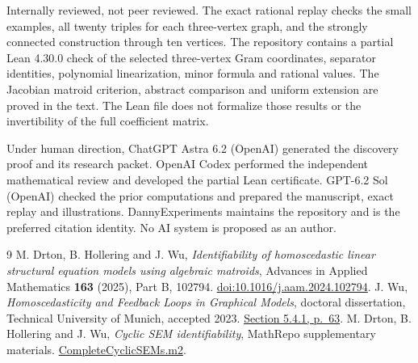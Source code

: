 \documentclass[11pt,a4paper]{amsart}
\begin{document}
Internally reviewed, not peer reviewed. The exact rational replay
checks the small examples, all twenty triples for each three-vertex
graph, and the strongly connected construction through ten vertices.
The repository contains a partial Lean 4.30.0 check of the selected
three-vertex Gram coordinates, separator identities, polynomial
linearization, minor formula and rational values. The Jacobian
matroid criterion, abstract comparison and uniform extension are
proved in the text. The Lean file does not formalize those results
or the invertibility of the full coefficient matrix.

Under human direction, ChatGPT Astra 6.2 (OpenAI) generated the
discovery proof and its research packet. OpenAI Codex performed the
independent mathematical review and developed the partial Lean
certificate. GPT-6.2 Sol (OpenAI) checked the prior computations
and prepared the manuscript, exact replay and illustrations.
DannyExperiments maintains the repository and is the preferred
citation identity. No AI system is proposed as an author.

\begin{thebibliography}{9}
M. Drton, B. Hollering and J. Wu,
\emph{Identifiability of homoscedastic linear structural equation
models using algebraic matroids},
Advances in Applied Mathematics \textbf{163} (2025), Part B, 102794.
\href{https://doi.org/10.1016/j.aam.2024.102794}{doi:10.1016/j.aam.2024.102794}.
J. Wu, \emph{Homoscedasticity and Feedback Loops in Graphical Models},
doctoral dissertation, Technical University of Munich, accepted 2023.
\href{https://mediatum.ub.tum.de/doc/1713538/document.pdf#page=79}{Section 5.4.1, p.~63}.
M. Drton, B. Hollering and J. Wu,
\emph{Cyclic SEM identifiability}, MathRepo supplementary materials.
\href{https://mathrepo.mis.mpg.de/_downloads/8104bb4d6c771e454c148c4d4e0f542e/CompleteCyclicSEMs.m2}{CompleteCyclicSEMs.m2}.
\end{thebibliography}
\end{document}
